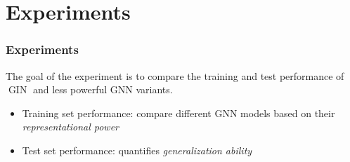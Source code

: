 \documentclass[handout]{beamer}
\DeclareMathOperator{\gin}{GIN}
\begin{document}

\section{Experiments}

\begin{frame}
\frametitle{Experiments}

The goal of the experiment is to compare the training and test performance of $\gin$ and less powerful GNN variants. \pause

\begin{itemize}
	\item Training set performance: compare different GNN models based on their {\it representational power}

	\item Test set performance: quantifies {\it generalization ability}
\end{itemize}

\end{frame}

\end{document}
